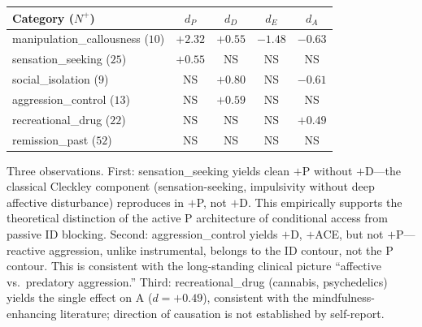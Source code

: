 \begin{center}
\begin{tabular}{lcccc}
\toprule
Category ($N^+$) & $d_P$ & $d_D$ & $d_E$ & $d_A$ \\
\midrule
manipulation\_callousness ($10$)   & $+2.32$ & $+0.55$ & $-1.48$ & $-0.63$ \\
sensation\_seeking ($25$)          & $+0.55$ & NS      & NS      & NS      \\
social\_isolation ($9$)            & NS      & $+0.80$ & NS      & $-0.61$ \\
aggression\_control ($13$)         & NS      & $+0.59$ & NS      & NS      \\
recreational\_drug ($22$)          & NS      & NS      & NS      & $+0.49$ \\
remission\_past ($52$)             & NS      & NS      & NS      & NS      \\
\bottomrule
\end{tabular}
\end{center}

Three observations. First: sensation\_seeking yields clean $+$P without $+$D---the classical Cleckley component (sensation-seeking, impulsivity without deep affective disturbance) reproduces in $+$P, not $+$D. This empirically supports the theoretical distinction of the active P architecture of conditional access from passive ID blocking. Second: aggression\_control yields $+$D, $+$ACE, but not $+$P---reactive aggression, unlike instrumental, belongs to the ID contour, not the P contour. This is consistent with the long-standing clinical picture ``affective vs.\ predatory aggression.'' Third: recreational\_drug (cannabis, psychedelics) yields the single effect on A ($d = +0.49$), consistent with the mindfulness-enhancing literature; direction of causation is not established by self-report.

